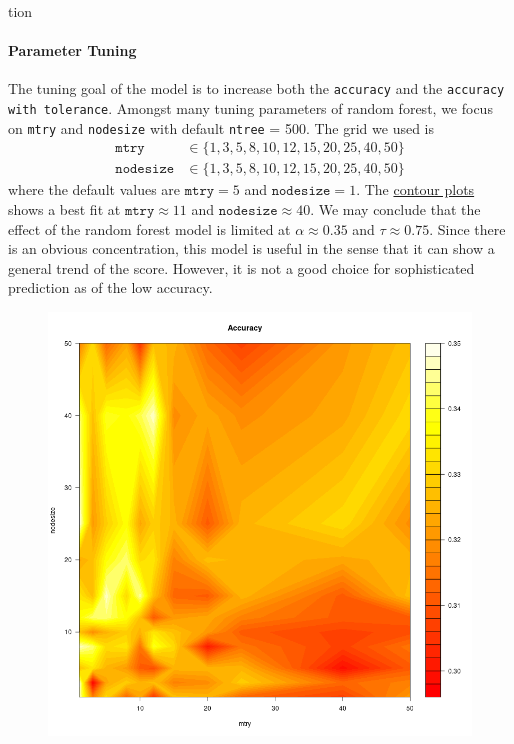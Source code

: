 tion\documentclass[8pt]{article}
\begin{document}
\begin{enumerate}
\paragraph{Parameter Tuning}
The tuning goal of the model is to increase both the \texttt{accuracy} and the \texttt{accuracy with tolerance}.
Amongst many tuning parameters of random forest, we focus on \texttt{mtry} and \texttt{nodesize} with default 
\texttt{ntree} = 500. The grid we used is 
\begin{align*}
    \texttt{mtry} &\in \{1, 3, 5, 8, 10, 12, 15, 20, 25, 40,  50 \} \\
    \texttt{nodesize} &\in \{1, 3, 5, 8, 10, 12, 15, 20, 25, 40,  50 \}
\end{align*}
where the default values are $\texttt{mtry} = 5$ and $\texttt{nodesize} = 1$. 
The \hyperref[fig:contour]{contour plots} shows a best fit at $\texttt{mtry} \approx 11$ and $\texttt{nodesize} \approx 40$.
We may conclude that the effect of the random forest model is limited at $\alpha \approx 0.35$
and $\tau \approx 0.75$. Since there is an obvious concentration, 
this model is useful in the sense that it can show a general trend of the score.
However, it is not a good choice for sophisticated prediction as of the low accuracy.
\begin{figure}[H]
    \includegraphics*[scale=0.25]{figures/contour_plot_accuracy.png}

\end{figure}
\end{enumerate}
\end{document}
